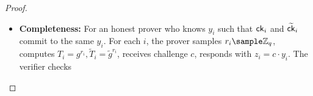 \begin{proof}
    \begin{itemize}
        \item \textbf{Completeness:} For an honest prover who knows $y_i$ such that $\mathsf{ck}_i$ and $\widetilde{\mathsf{ck}}_i$ commit to the same $y_i$. For each $i$, the prover samples $r_i \sample \Z_q$, computes $T_{i} = g^{r_i}, \widetilde{T}_i = \tilde{g}^{r_i}$, receives challenge $c$, responds with $z_i = c \cdot y_i$. The verifier checks 
    




\end{itemize}
\end{proof}
